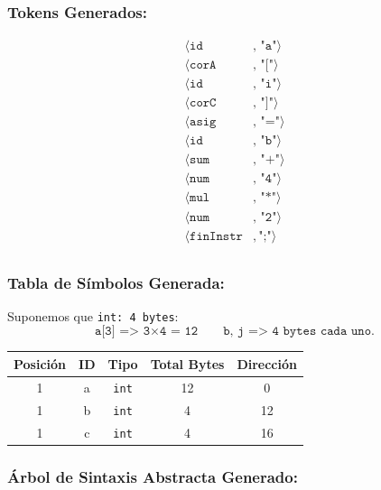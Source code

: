 \documentclass[12pt,letterpaper]{article}
\begin{document}
\begin{enumerate}[label=\arabic*.]
\subsubsection*{Tokens Generados:}

\[
\begin{aligned}
  \langle \texttt{id}&, \, \texttt{"a"} \rangle\\
  \langle \texttt{corA}&, \, \texttt{"["} \rangle\\
  \langle \texttt{id}&, \, \texttt{"i"} \rangle\\
  \langle \texttt{corC}&, \, \texttt{"]"} \rangle\\
  \langle \texttt{asig}&, \, \texttt{"="} \rangle\\
  \langle \texttt{id}&, \, \texttt{"b"} \rangle\\
  \langle \texttt{sum}&, \, \texttt{"+"} \rangle\\
  \langle \texttt{num}&, \, \texttt{"4"} \rangle\\
  \langle \texttt{mul}&, \, \texttt{"*"} \rangle\\
  \langle \texttt{num}&, \, \texttt{"2"} \rangle\\
  \langle \texttt{finInstr}&, \texttt{";"} \rangle\\
\end{aligned}
\]
  
\subsubsection*{Tabla de Símbolos Generada:}
Suponemos que \texttt{int: 4 bytes}:
\[
\texttt{a[3] => 3} \times \texttt{4 = 12}
\qquad
\texttt{b, j => 4 bytes cada uno.}
\]

\begin{table}[H]
  \centering
  \begin{tabular}{ccccc}
    Posición & ID & Tipo & Total Bytes & Dirección\\\hline
    1 & a & \texttt{int} & 12 & 0\\\hline
    1 & b & \texttt{int} & 4 & 12\\\hline
    1 & c & \texttt{int} & 4 & 16\\\hline
  \end{tabular}
\end{table}

\subsubsection*{Árbol de Sintaxis Abstracta Generado:}


\end{enumerate}
\end{document}

